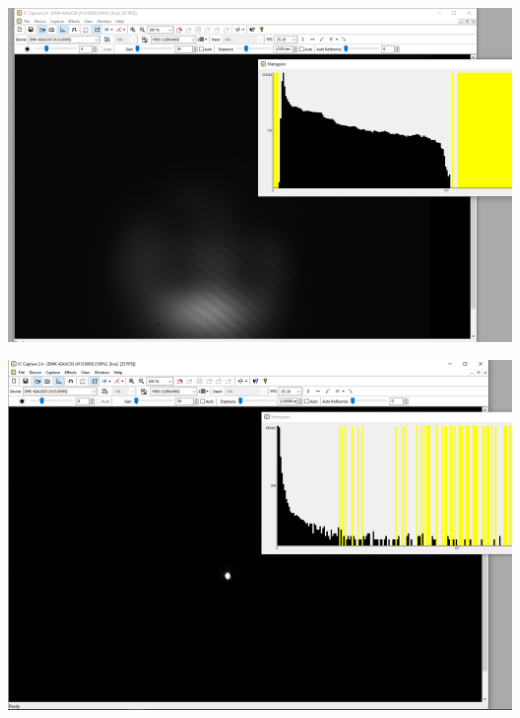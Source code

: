 \documentclass[11pt,ngerman]{scrartcl}
\begin{document}
\vspace{2mm}

\begin{minipage}{\textwidth}
	\begin{minipage}[t]{0.5\textwidth}
		\centering
		\includegraphics[width=\textwidth]{abbe/objekt0ordnung}
		\label{fig:bild0}
	\end{minipage}
	\vspace{2mm}
	\begin{minipage}[t]{0.50\textwidth}
		\centering
		\includegraphics[width=\textwidth]{abbe/beugungsbild0ordnungen}
		\label{fig:beugung0}
	\end{minipage}
	\vspace{1em}
\end{minipage}
\end{document}
